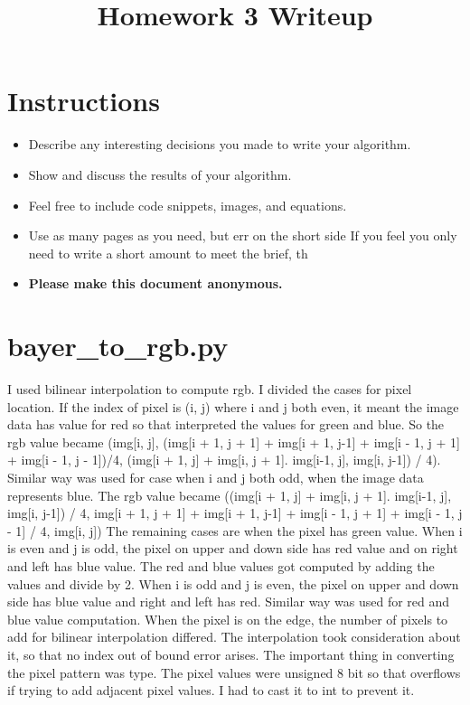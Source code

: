\date{}

\title{\vspace{-1cm}Homework 3 Writeup}



\maketitle
\vspace{-3cm}
\thispagestyle{fancy}

\section*{Instructions}
\begin{itemize}
  \item Describe any interesting decisions you made to write your algorithm.
  \item Show and discuss the results of your algorithm.
  \item Feel free to include code snippets, images, and equations.
  \item Use as many pages as you need, but err on the short side If you feel you only need to write a short amount to meet the brief, th
  
  \item \textbf{Please make this document anonymous.}
\end{itemize}

\section*{bayer\_to\_rgb.py}

I used bilinear interpolation to compute rgb. I divided the cases for pixel location. If the index of pixel is (i, j) where i and j both even, it meant the image data has value for red so that interpreted the values for green and blue. So the rgb value became (img[i, j], (img[i + 1, j + 1] + img[i + 1, j-1] + img[i - 1, j + 1] + img[i - 1, j - 1])/4, (img[i + 1, j] + img[i, j + 1]. img[i-1, j], img[i, j-1]) / 4). Similar way was used for case when i and j both odd, when the image data represents blue. The rgb value became ((img[i + 1, j] + img[i, j + 1]. img[i-1, j], img[i, j-1]) / 4, img[i + 1, j + 1] + img[i + 1, j-1] + img[i - 1, j + 1] + img[i - 1, j - 1] / 4, img[i, j])
The remaining cases are when the pixel has green value. When i is even and j is odd, the pixel on upper and down side has red value and on right and left has blue value. The red and blue values got computed by adding the values and divide by 2. When i is odd and j is even, the pixel on upper and down side has blue value and right and left has red. Similar way was used for red and blue value computation. When the pixel is on the edge, the number of pixels to add for bilinear interpolation differed. The interpolation took consideration about it, so that no index out of bound error arises. 
The important thing in converting the pixel pattern was type. The pixel values were unsigned 8 bit so that overflows if trying to add adjacent pixel values. I had to cast it to int to prevent it. 

